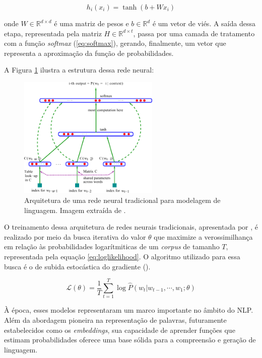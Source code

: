 \begin{equation}
    \label{eq:nnlm}
    h_{i}(x_{i}) = \tanh \left( b + W x_{i} \right)
\end{equation}

onde $W \in \mathbb{R}^{d \times d}$ é uma matriz de pesos e $b \in \mathbb{R}^{d}$ é um vetor de viés. A saída dessa etapa, representada pela matriz $H \in \mathbb{R}^{d \times t}$, passa por uma camada de tratamento com a função \textit{softmax} (\ref{eq:softmax}), gerando, finalmente, um vetor que representa a aproximação da função de probabilidades.

A Figura \ref{fig:nnlm} ilustra a estrutura dessa rede neural:

\begin{figure}[H]
    \centering
    \caption{Arquitetura de uma rede neural tradicional para modelagem de linguagem. Imagem extraída de \cite{bengio-et-al-2003}.}
    \label{fig:nnlm}
    \includegraphics[width=0.6\textwidth]{../figuras/nnlm.pdf}
\end{figure}

O treinamento dessa arquitetura de redes neurais tradicionais, apresentada por \citet{bengio-et-al-2003}, é realizado por meio da busca iterativa do valor $\theta$ que maximize a verossimilhança em relação às probabilidades logarítmiticas de um \textit{corpus} de tamanho $T$, representada pela equação \ref{eq:loglikelihood}. O algoritmo utilizado para essa busca é o de subida estocástica do gradiente (\cite{machine-learning-in-action}).

\begin{equation}
    \label{eq:loglikelihood}
    \mathcal{L}(\theta) = \frac{1}{T}\sum_{t=1}^{T} \log \widehat{P}(w_{t} | w_{t-1}, \cdots, w_{1}; \theta)
\end{equation}

À época, esses modelos representaram um marco importante no âmbito do NLP. Além da abordagem pioneira na representação de palavras, futuramente estabelecidos como os \textit{embeddings}, sua capacidade de aprender funções que estimam probabilidades oferece uma base sólida para a compreensão e geração de linguagem.

